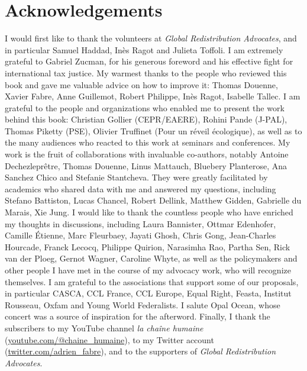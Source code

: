 \documentclass[a5paper,english,openany]{memoir}
\begin{document}
\section*{Acknowledgements}\label{sec:merci} 
I would first like to thank the volunteers at \textit{Global Redistribution Advocates}, and in particular Samuel Haddad, Inès Ragot and Julieta Toffoli. I am extremely grateful to Gabriel Zucman, for his generous foreword and his effective fight for international tax justice. My warmest thanks to the people who reviewed this book and gave me valuable advice on how to improve it: Thomas Douenne, Xavier Fabre, Anne Guillemot, Robert Philippe, Inès Ragot, Isabelle Tallec. I am grateful to the people and organizations who enabled me to present the work behind this book: Christian Gollier (CEPR/EAERE), Rohini Pande (J-PAL), Thomas Piketty (PSE), Olivier Truffinet (Pour un réveil écologique), as well as to the many audiences who reacted to this work at seminars and conferences. My work is the fruit of collaborations with invaluable co-authors, notably Antoine Dechezleprêtre, Thomas Douenne, Linus Mattauch, Bluebery Planterose, Ana Sanchez Chico and Stefanie Stantcheva. 
They were greatly facilitated by academics who shared data with me and answered my questions, including Stefano Battiston, Lucas Chancel, Robert Dellink, Matthew Gidden, Gabrielle du Marais, Xie Jung. %
I would like to thank the countless people who have enriched my thoughts in discussions, including Laura Bannister, Ottmar Edenhofer, Camille Étienne, Marc Fleurbaey, Jayati Ghosh, Chris Gong, Jean-Charles Hourcade, Franck Lecocq, Philippe Quirion, Narasimha Rao, Partha Sen, Rick van der Ploeg, Gernot Wagner, Caroline Whyte, as well as the policymakers and other people I have met in the course of my advocacy work, who will recognize themselves. I am grateful to the associations that support some of our proposals, 
in particular CASCA, CCL France, CCL Europe, Equal Right, Feasta, Institut Rousseau, Oxfam and Young World Federalists. I salute Opal Ocean, whose concert was a source of inspiration for the afterword. Finally, I thank the subscribers to my YouTube channel \textit{la chaîne humaine} (\href{https://www.youtube.com/@chaine_humaine}{youtube.com/@chaine\_humaine}), to my Twitter account (\href{https://twitter.com/adrien_fabre}{twitter.com/adrien\_fabre}), and to the supporters of \textit{Global Redistribution Advocates}.


\pagebreak \vspace*{-2cm}
\listoftables \vspace{-1cm}
\listoffigures
\end{document}
